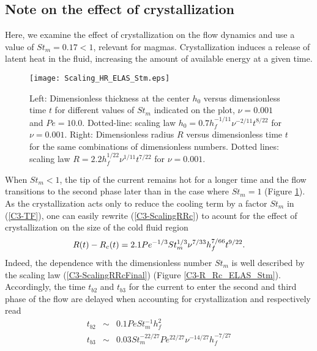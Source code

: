 \subsection{Note on the effect of crystallization}
\label{C3-sec:note-effect-cryst-1}

Here, we  examine the effect  of crystallization on the  flow dynamics
and  use   a  value   of  $St_m=0.17  <   1$,  relevant   for  magmas.
Crystallization  induces  a  release  of latent  heat  in  the  fluid,
increasing the amount of available energy at a given time.
\begin{figure}
  \begin{center}
    \graphicspath{ {/Users/thorey/Documents/These/Projet/Refroidissement/Skin_Model/Figure/JFM_V13/} }
    \texttt{[image: Scaling\_HR\_ELAS\_Stm.eps]}
    \caption{Left: Dimensionless thickness at  the center $h_0$ versus
      dimensionless time $t$ for  different values of $St_m$ indicated
      on the  plot, $\nu=0.001$ and $Pe  =10.0$.  Dotted-line: scaling
      law $h_0= 0.7h_f^{-1/11}\nu^{-2/11}t^{8/22}$  for $\nu = 0.001$.
      Right: Dimensionless  radius $R$  versus dimensionless  time $t$
      for  the same  combinations  of  dimensionless numbers.   Dotted
      lines:  scaling  law  $R=  2.2h_f^{1/22}\nu^{1/11}t^{7/22}$  for
      $\nu = 0.001$.}
    \label{C3-Scaling_HR_ELAS_Stm}
  \end{center}
\end{figure}
When $St_m<1$,  the tip of the  current remains hot for  a longer time
and the  flow transitions to the  second phase later than  in the case
where   $St_m=1$   (Figure  \ref{C3-Scaling_HR_ELAS_Stm}).    As   the
crystallization  acts only  to reduce  the  cooling term  by a  factor
$St_m$ in (\ref{C3-TF}), one  can easily rewrite (\ref{C3-ScalingRRc})
to acount  for the effect of  crystallization on the size  of the cold
fluid region
\begin{equation}
  R(t)-R_c(t) =2.1Pe^{-1/3}St_m^{1/3}\nu^{7/33}
  h_f^{7/66}t^{9/22}.\label{C3-ScalingRRcFinal}\\
\end{equation}
Indeed, the  dependence with the  dimensionless number $St_m$  is well
described  by  the   scaling  law  (\ref{C3-ScalingRRcFinal})  (Figure
\ref{C3-R_Rc_ELAS_Stm}).  Accordingly, the  time $t_{b2}$ and $t_{b3}$
for the current  to enter the second  and third phase of  the flow are
delayed when accounting for crystallization and respectively read
\begin{eqnarray}
  t_{b2}&\sim&0.1Pe St_m^{-1} h_f^2\label{C3-tb2}\\
  t_{b3}&\sim& 0.03 St_m^{-22/27}Pe^{22/27}\nu^{-14/27}h_f^{-7/27}\label{C3-tb3}
\end{eqnarray}

